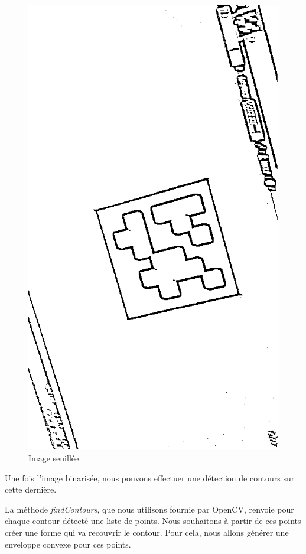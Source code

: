         \begin{figure}[!h]
            \centering
            \includegraphics[scale=0.25]{img/threshold.png}
            \caption{Image seuillée}
        \end{figure}

        Une fois l'image binarisée, nous pouvons effectuer une détection de contours sur cette dernière.

        La méthode \textit{findContours}, que nous utilisons fournie par OpenCV, renvoie pour chaque contour détecté une liste de points. Nous souhaitons à partir de ces points créer une forme qui va recouvrir le contour. Pour cela, nous allons générer une enveloppe convexe pour ces points.

